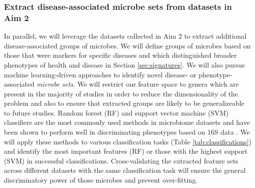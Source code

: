 \documentclass[12pt]{article}
\begin{document}
\subsubsection{Extract disease-associated microbe sets from datasets in Aim 2}
In parallel, we will leverage the datasets collected in Aim 2 to extract additional 
disease-associated groups of microbes. We will define groups of 
microbes based on those that were markers for specific diseases and which
distinguished broader phenotypes of health and disease in Section \ref{sec:signatures}. 
We will also pursue machine learning-driven approaches to identify novel disease- or 
phenotype-associated \textit{microbe sets}. We will restrict our feature space
to genera which are present in the majority of studies in order to reduce the
dimensionality of the problem and also to ensure that extracted groups
are likely to be generalizeable to future studies. Random forest (RF) and support
vector machine (SVM) classifiers are the most commonly used methods in
microbiome datasets and have been shown to perform well in discriminating
phenotypes based on 16S data \cite{ibd-papa, knights-supervised-2010, pasolli-meta_analysis-2016}. We will apply these methods to various classification tasks (Table \ref{tab:classifications})
and identify the most important features (RF) or those with the highest support (SVM)
in successful classifications.
Cross-validating the extracted feature sets across different datasets with the same
classification task will ensure the general discriminatory 
power of those microbes and prevent over-fitting.
\end{document}
